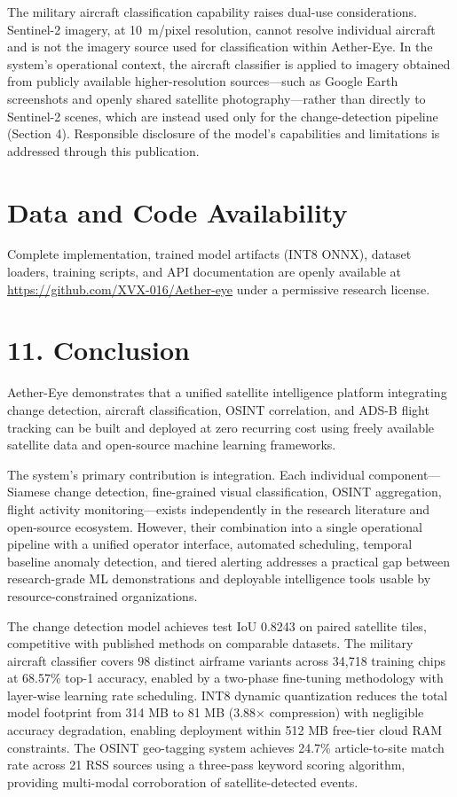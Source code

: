 \documentclass[11pt,a4paper]{article}
\begin{document}
The military aircraft classification capability raises dual-use considerations. Sentinel-2 imagery, at 10~m/pixel resolution, cannot resolve individual aircraft and is not the imagery source used for classification within Aether-Eye. In the system's operational context, the aircraft classifier is applied to imagery obtained from publicly available higher-resolution sources---such as Google Earth screenshots and openly shared satellite photography---rather than directly to Sentinel-2 scenes, which are instead used only for the change-detection pipeline (Section 4). Responsible disclosure of the model's capabilities and limitations is addressed through this publication.

\hypertarget{data-and-code-availability}{%
\section{Data and Code Availability}\label{data-and-code-availability}}

Complete implementation, trained model artifacts (INT8 ONNX), dataset loaders, training scripts, and API documentation are openly available at \url{https://github.com/XVX-016/Aether-eye} under a permissive research license.

\hypertarget{conclusion}{%
\section{11. Conclusion}\label{conclusion}}

Aether-Eye demonstrates that a unified satellite intelligence platform integrating change detection, aircraft classification, OSINT correlation, and ADS-B flight tracking can be built and deployed at zero recurring cost using freely available satellite data and open-source machine learning frameworks.

The system's primary contribution is integration. Each individual component---Siamese change detection, fine-grained visual classification, OSINT aggregation, flight activity monitoring---exists independently in the research literature and open-source ecosystem. However, their combination into a single operational pipeline with a unified operator interface, automated scheduling, temporal baseline anomaly detection, and tiered alerting addresses a practical gap between research-grade ML demonstrations and deployable intelligence tools usable by resource-constrained organizations.

The change detection model achieves test IoU 0.8243 on paired satellite tiles, competitive with published methods on comparable datasets. The military aircraft classifier covers 98 distinct airframe variants across 34,718 training chips at 68.57\% top-1 accuracy, enabled by a two-phase fine-tuning methodology with layer-wise learning rate scheduling. INT8 dynamic quantization reduces the total model footprint from 314 MB to 81 MB (3.88× compression) with negligible accuracy degradation, enabling deployment within 512 MB free-tier cloud RAM constraints. The OSINT geo-tagging system achieves 24.7\% article-to-site match rate across 21 RSS sources using a three-pass keyword scoring algorithm, providing multi-modal corroboration of satellite-detected events.
\end{document}
